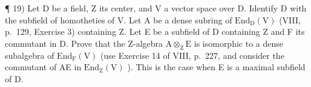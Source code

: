 ¶ 19) Let D be a field, Z its center, and V a vector space over D. Identify D with the subfield of homotheties of V. Let A be a dense subring of \(\mathrm{End}_{\mathrm{D}}(\mathrm{V})\) (VIII, p.~129, Exercise 3) containing Z. Let E be a subfield of D containing Z and F its commutant in D. Prove that the Z-algebra \(\mathrm{A} \otimes_{\mathrm{Z}} \mathrm{E}\) is isomorphic to a dense subalgebra of \(\mathrm{End}_{\mathrm{F}}(\mathrm{V})\) (use Exercise 14 of VIII, p.~227, and consider the commutant of AE in \(\mathrm{End}_{\mathrm{Z}}(\mathrm{V})\) ). This is the case when E is a maximal subfield of D.

